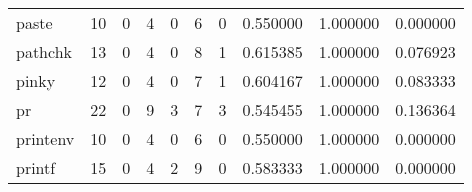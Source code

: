 \begin{longtable}{lrrrrrrrrr}
paste     &                                       10 &                                                  0 &                                                  4 &                                                  0 &                                                  6 &                                                  0 &                                           0.550000 &                               1.000000 &                             0.000000 \\
pathchk   &                                       13 &                                                  0 &                                                  4 &                                                  0 &                                                  8 &                                                  1 &                                           0.615385 &                               1.000000 &                             0.076923 \\
pinky     &                                       12 &                                                  0 &                                                  4 &                                                  0 &                                                  7 &                                                  1 &                                           0.604167 &                               1.000000 &                             0.083333 \\
pr        &                                       22 &                                                  0 &                                                  9 &                                                  3 &                                                  7 &                                                  3 &                                           0.545455 &                               1.000000 &                             0.136364 \\
printenv  &                                       10 &                                                  0 &                                                  4 &                                                  0 &                                                  6 &                                                  0 &                                           0.550000 &                               1.000000 &                             0.000000 \\
printf    &                                       15 &                                                  0 &                                                  4 &                                                  2 &                                                  9 &                                                  0 &                                           0.583333 &                               1.000000 &                             0.000000 \\

\end{longtable}

